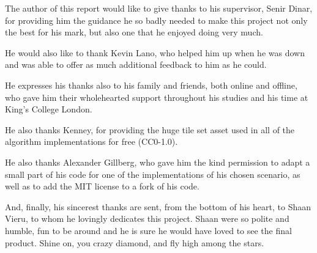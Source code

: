 
The author of this report would like to give thanks to his supervisor, Senir Dinar, for providing him the guidance he so badly needed to make this project not only the best for his mark, but also one that he enjoyed doing very much.

He would also like to thank Kevin Lano, who helped him up when he was down and was able to offer as much additional feedback to him as he could.

He expresses his thanks also to his family and friends, both online and offline, who gave him their wholehearted support throughout his studies and his time at King's College London.

He also thanks Kenney, for providing the huge tile set asset used in all of the algorithm implementations for free (CC0-1.0).

He also thanks Alexander Gillberg, who gave him the kind permission to adapt a small part of his code for one of the implementations of his chosen scenario, as well as to add the MIT license to a fork of his code.

And, finally, his sincerest thanks are sent, from the bottom of his heart, to Shaan Vieru, to whom he lovingly dedicates this project. Shaan were so polite and humble, fun to be around and he is sure he would have loved to see the final product. Shine on, you crazy diamond, and fly high among the stars.